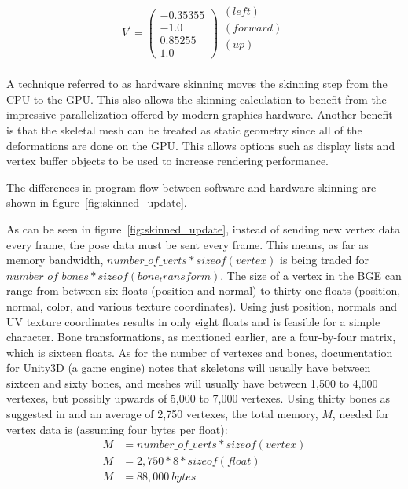 \begin{gather}
 V^\prime = \left(\begin{array}{c}-0.35355\\-1.0\\0.85255\\1.0\end{array}\right)\begin{array}{c}(left)\\(forward)\\(up)\\ \\\end{array}
\end{gather}


A technique referred to as hardware skinning moves the skinning step from the CPU to the GPU.
This also allows the skinning calculation to benefit from the impressive parallelization offered by modern graphics hardware.
Another benefit is that the skeletal mesh can be treated as static geometry since all of the deformations are done on the GPU.
This allows options such as display lists and vertex buffer objects\cite{ARB_texture_buffer_object} to be used to increase rendering performance.

The differences in program flow between software and hardware skinning are shown in figure~\ref{fig:skinned_update}.


As can be seen in figure~\ref{fig:skinned_update}, instead of sending new vertex data every frame, the pose data must be sent every frame.
This means, as far as memory bandwidth, $number\_of\_verts*sizeof(vertex)$ is being traded for $number\_of\_bones*sizeof(bone_transform)$.
The size of a vertex in the BGE can range from between six floats (position and normal) to thirty-one floats (position, normal, color, and various texture coordinates).
Using just position, normals and UV texture coordinates results in only eight floats and is feasible for a simple character.
Bone transformations, as mentioned earlier, are a four-by-four matrix, which is sixteen floats.
As for the number of vertexes and bones, documentation for Unity3D (a game engine) notes that skeletons will usually have between sixteen and sixty bones, and meshes will usually have between 1,500 to 4,000 vertexes, but possibly upwards of 5,000 to 7,000 vertexes\cite{unity_opt_char}.
Using thirty bones as suggested in \cite{unity_opt_char} and an average of 2,750 vertexes, the total memory, $M$, needed for vertex data is (assuming four bytes per float):
\begin{align*}
 M &= number\_of\_verts*sizeof(vertex)\\
 M &= 2,750 * 8 * sizeof(float)\\
 M &= 88,000\ bytes
\end{align*}

